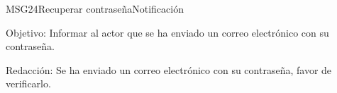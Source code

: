 \begin{mensaje}{MSG24}{Recuperar contraseña}{Notificación}
	\item [Objetivo:] Informar al actor que se ha enviado un correo electrónico con su contraseña.
	\item[Redacción:] Se ha enviado un correo electrónico con su contraseña, favor de verificarlo.
\end{mensaje}